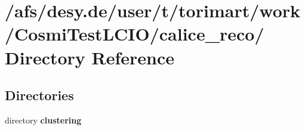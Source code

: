 \section{/afs/desy.de/user/t/torimart/work/CosmiTestLCIO/calice\_\-reco/ Directory Reference}
\label{dir_f98b43a53f5533225f05987ae358305b}
\subsection*{Directories}
\begin{DoxyCompactItemize}
\item 
directory {\bf clustering}
\end{DoxyCompactItemize}

